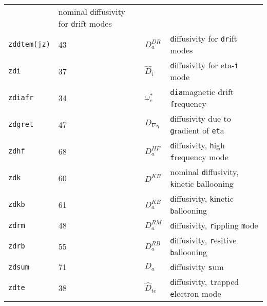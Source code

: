 \begin{table}
\begin{center}
\begin{tabular}{lllp{}}
                    & nominal {\tt d}iffusivity for {\tt d}rift modes \\
{\tt zddtem(jz)} & 43 & $D_{a}^{DR}$
                    & {\tt d}iffusivity for {\tt dr}ift modes     \\
{\tt zdi   } & 37 & ${\hat D}_{i}$
                    & {\tt d}iffusivity for eta-{\tt i} mode      \\
{\tt zdiafr} & 34 & $\omega_{e}^{*}$
                    & {\tt dia}magnetic drift {\tt f}requency    \\
{\tt zdgret} & 47 & $D_{\nabla \eta}$
                    & {\tt d}iffusivity due to {\tt g}radient of {\tt et}a \\
{\tt zdhf  } & 68 & $D_{a}^{HF}$
                    & {\tt d}iffusivity, {\tt h}igh {\tt f}requency mode \\
{\tt zdk   } & 60 & $D^{KB}$
                & nominal {\tt d}iffusivity, {\tt k}inetic {\tt b}allooning \\
{\tt zdkb  } & 61 & $D^{KB}_{a}$
                    & {\tt d}iffusivity, {\tt k}inetic {\tt b}allooning \\
{\tt zdrm  } & 48 & $D^{RM}_{a}$
                    & {\tt d}iffusivity, {\tt r}ippling {\tt m}ode \\
{\tt zdrb  } & 55 & $D^{RB}_{a}$
                    & {\tt d}iffusivity, {\tt r}esitive {\tt b}allooning \\
{\tt zdsum } & 71 & $D_{a}$
                    & {\tt d}iffusivity {\tt s}um                \\
{\tt zdte  } & 38 & ${\hat D}_{te}$
                    & {\tt d}iffusivity, {\tt t}rapped {\tt e}lectron mode
\end{tabular}
\end{center}
\end{table}



